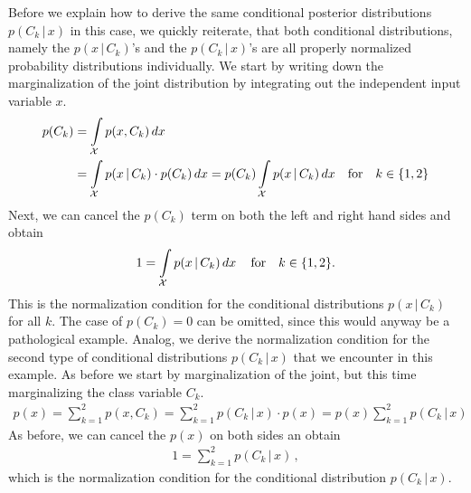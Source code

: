 \documentclass[11pt, DINA4, fleqn]{amsart}
\begin{document}
Before we explain how to derive the same conditional posterior distributions $p(C_k \, | \, x)$ in this case, we quickly reiterate, that both conditional distributions, namely the $p(x \, | \, C_k)$'s and the $p(C_k \, | \, x)$'s are all properly normalized probability distributions individually.
We start by writing down the marginalization of the joint distribution by integrating out the independent input variable $x$.
\begin{align}
p(C_k) &= \int\displaylimits_{\mathcal{X}} p(x, C_k) \, dx \\
&= \int\displaylimits_{\mathcal{X}} p(x \, | \, C_k) \cdot p(C_k) \, dx
= p(C_k) \int\displaylimits_{\mathcal{X}} p(x \, | \, C_k) \, dx \quad \text{for} \quad k\in\{1, 2\}
\end{align}
Next, we can cancel the $p(C_k)$ term on both the left and right hand sides and obtain
\begin{align}
1 = \int\displaylimits_{\mathcal{X}} p(x \, | \, C_k) \, dx \, \quad \text{for} \quad k\in\{1, 2\} .
\end{align}
This is the normalization condition for the conditional distributions $p(x \, | \, C_k)$ for all $k$.
The case of $p(C_k) = 0$ can be omitted, since this would anyway be a pathological example.
Analog, we derive the normalization condition for the second type of conditional distributions $p(C_k \, | \, x)$ that we encounter in this example. As before we start by marginalization of the joint, but this time marginalizing the class variable $C_k$.
\begin{align}
p(x) = \sum_{k = 1}^{2} p(x, C_k) = \sum_{k = 1}^{2} p(C_k \, | \, x) \cdot p(x) = p(x)\sum_{k = 1}^{2} p(C_k \, | \, x)
\end{align}
As before, we can cancel the $p(x)$ on both sides an obtain
\begin{align}
1 = \sum_{k = 1}^{2} p(C_k \, | \, x) \, ,
\end{align}
which is the normalization condition for the conditional distribution $p(C_k \, | \, x)$.









\newpage
\end{document}
